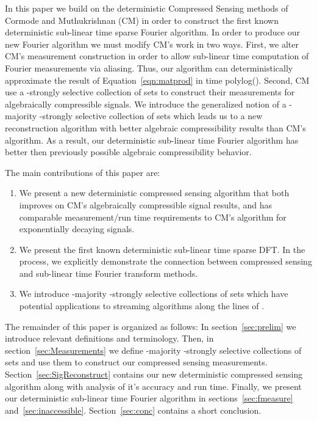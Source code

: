 \documentclass{article}
\begin{document}
In this paper we build on the deterministic Compressed Sensing methods of Cormode and Muthukrishnan (CM) \cite{CMDetCS3,CMDetCS1,CMDetCS2} in order to construct the first known deterministic sub-linear time sparse Fourier algorithm.  In order to produce our new Fourier algorithm we must modify CM's work in two ways.  First, we alter CM's measurement construction in order to allow sub-linear time computation of Fourier measurements via aliasing.  Thus, our algorithm can deterministically approximate the result of Equation~\ref{eqn:matprod} in time polylog().  Second, CM use a -strongly selective collection of sets \cite{Constructions} to construct their measurements for algebraically compressible signals.  We introduce the generalized notion of a -majority -strongly selective collection of sets which leads us to a new reconstruction algorithm with better algebraic compressibility results than CM's algorithm.  As a result, our deterministic sub-linear time Fourier algorithm has better then previously possible algebraic compressibility behavior.

The main contributions of this paper are:
\begin{enumerate}
\item We present a new deterministic compressed sensing algorithm that both  improves on CM's algebraically compressible signal results, and  has comparable measurement/run time requirements to CM's algorithm for exponentially decaying signals.
\item We present the first known deterministic sub-linear time sparse DFT.  In the process, we explicitly demonstrate the connection between compressed sensing and sub-linear time Fourier transform methods.
\item We introduce -majority -strongly selective collections of sets which have potential applications to streaming algorithms along the lines of \cite{FirstDetCS, Crprecis}.
\end{enumerate}

The remainder of this paper is organized as follows:  In section~\ref{sec:prelim} we introduce relevant definitions and terminology.  Then, in section~\ref{sec:Measurements} we define -majority -strongly selective collections of sets and use them to construct our compressed sensing measurements.  Section~\ref{sec:SigReconstruct} contains our new deterministic compressed sensing algorithm along with analysis of it's accuracy and run time.  Finally, we present our deterministic sub-linear time Fourier algorithm in sections~\ref{sec:fmeasure} and~\ref{sec:inaccessible}.  Section~\ref{sec:conc} contains a short conclusion.
\end{document}
